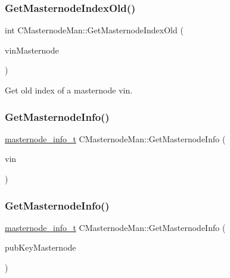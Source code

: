 \subsubsection{\texorpdfstring{Get\+Masternode\+Index\+Old()}{GetMasternodeIndexOld()}}
{\footnotesize\ttfamily int C\+Masternode\+Man\+::\+Get\+Masternode\+Index\+Old (\begin{DoxyParamCaption}\item[{const C\+Tx\+In \&}]{vin\+Masternode }\end{DoxyParamCaption})\hspace{0.3cm}{\ttfamily [inline]}}



Get old index of a masternode vin. 

\mbox{\label{class_c_masternode_man_a7623608ee2bd62f3ef63d7c0f503e881}} 
\subsubsection{\texorpdfstring{Get\+Masternode\+Info()}{GetMasternodeInfo()}\hspace{0.1cm}{\footnotesize\ttfamily [1/2]}}
{\footnotesize\ttfamily \mbox{\hyperlink{structmasternode__info__t}{masternode\+\_\+info\+\_\+t}} C\+Masternode\+Man\+::\+Get\+Masternode\+Info (\begin{DoxyParamCaption}\item[{const C\+Tx\+In \&}]{vin }\end{DoxyParamCaption})}

\mbox{\label{class_c_masternode_man_a46247936554d84ce942c384c80f74e35}} 
\subsubsection{\texorpdfstring{Get\+Masternode\+Info()}{GetMasternodeInfo()}\hspace{0.1cm}{\footnotesize\ttfamily [2/2]}}
{\footnotesize\ttfamily \mbox{\hyperlink{structmasternode__info__t}{masternode\+\_\+info\+\_\+t}} C\+Masternode\+Man\+::\+Get\+Masternode\+Info (\begin{DoxyParamCaption}\item[{const \mbox{\hyperlink{class_c_pub_key}{C\+Pub\+Key}} \&}]{pub\+Key\+Masternode }\end{DoxyParamCaption})}

